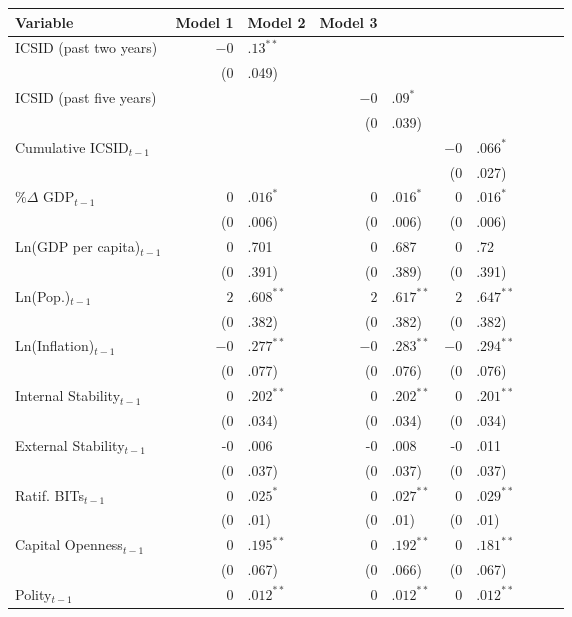 \begin{table}[ht]
\centering
{\footnotesize
\begin{tabular}{lr@{} lr@{}lr@{}lr@{}lr@{}}
 Variable & Model 1 & Model 2 & Model 3 \\ 
  \hline
\hline
ICSID (past two years) & $-0$&$.13^{\ast\ast}$ &&  &&  \\ 
   & (0&.049) &&  &&  \\ 
  ICSID (past five years) &&  & $-0$&$.09^{\ast}$ &&  \\ 
   &&  & (0&.039) &&  \\ 
  Cumulative ICSID$_{t-1}$ &&  &&  & $-0$&$.066^{\ast}$ \\ 
   &&  &&  & (0&.027) \\ 
  \%$\Delta$ GDP$_{t-1}$ & $0$&$.016^{\ast}$ & $0$&$.016^{\ast}$ & $0$&$.016^{\ast}$ \\ 
   & (0&.006) & (0&.006) & (0&.006) \\ 
  Ln(GDP per capita)$_{t-1}$ & 0&.701 & 0&.687 & 0&.72 \\ 
   & (0&.391) & (0&.389) & (0&.391) \\ 
  Ln(Pop.)$_{t-1}$ & $2$&$.608^{\ast\ast}$ & $2$&$.617^{\ast\ast}$ & $2$&$.647^{\ast\ast}$ \\ 
   & (0&.382) & (0&.382) & (0&.382) \\ 
  Ln(Inflation)$_{t-1}$ & $-0$&$.277^{\ast\ast}$ & $-0$&$.283^{\ast\ast}$ & $-0$&$.294^{\ast\ast}$ \\ 
   & (0&.077) & (0&.076) & (0&.076) \\ 
  Internal Stability$_{t-1}$ & $0$&$.202^{\ast\ast}$ & $0$&$.202^{\ast\ast}$ & $0$&$.201^{\ast\ast}$ \\ 
   & (0&.034) & (0&.034) & (0&.034) \\ 
  External Stability$_{t-1}$ & -0&.006 & -0&.008 & -0&.011 \\ 
   & (0&.037) & (0&.037) & (0&.037) \\ 
  Ratif. BITs$_{t-1}$ & $0$&$.025^{\ast}$ & $0$&$.027^{\ast\ast}$ & $0$&$.029^{\ast\ast}$ \\ 
   & (0&.01) & (0&.01) & (0&.01) \\ 
  Capital Openness$_{t-1}$ & $0$&$.195^{\ast\ast}$ & $0$&$.192^{\ast\ast}$ & $0$&$.181^{\ast\ast}$ \\ 
   & (0&.067) & (0&.066) & (0&.067) \\ 
  Polity$_{t-1}$ & $0$&$.012^{\ast\ast}$ & $0$&$.012^{\ast\ast}$ & $0$&$.012^{\ast\ast}$ \\ 

\end{tabular}}
\end{table}
